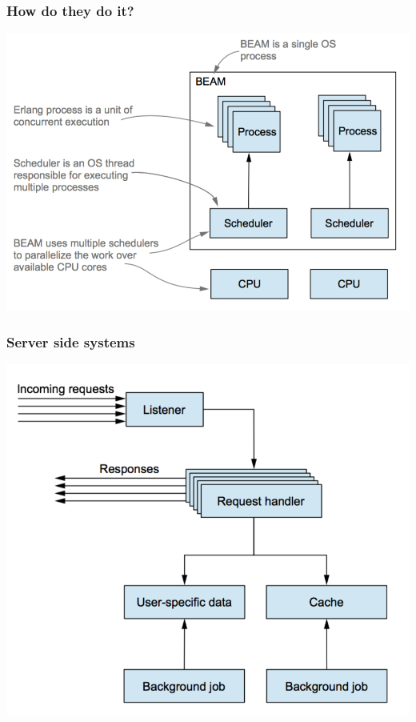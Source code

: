 \documentclass{beamer}
\begin{document}
\begin{frame}
  \frametitle{How do they do it?}
  \begin{center}
    \includegraphics[scale=.5]{beam.png}
  \end{center}
\end{frame}

\begin{frame}
  \frametitle{Server side systems}
  \begin{center}
    \includegraphics[scale=.5]{otp.png}
  \end{center}
\end{frame}
\end{document}
